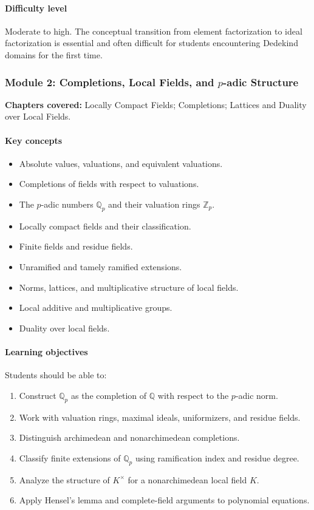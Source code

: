 \documentclass[11pt]{article}
\newcommand{\Q}{\mathbb{Q}}
\newcommand{\Z}{\mathbb{Z}}
\begin{document}
\paragraph{Difficulty level}
Moderate to high. The conceptual transition from element factorization to ideal factorization is essential and often difficult for students encountering Dedekind domains for the first time.

\subsubsection*{Module 2: Completions, Local Fields, and $p$-adic Structure}

\textbf{Chapters covered:} Locally Compact Fields; Completions; Lattices and Duality over Local Fields.

\paragraph{Key concepts}
\begin{itemize}
    \item Absolute values, valuations, and equivalent valuations.
    \item Completions of fields with respect to valuations.
    \item The $p$-adic numbers $\Q_p$ and their valuation rings $\Z_p$.
    \item Locally compact fields and their classification.
    \item Finite fields and residue fields.
    \item Unramified and tamely ramified extensions.
    \item Norms, lattices, and multiplicative structure of local fields.
    \item Local additive and multiplicative groups.
    \item Duality over local fields.
\end{itemize}

\paragraph{Learning objectives}
Students should be able to:
\begin{enumerate}
    \item Construct $\Q_p$ as the completion of $\Q$ with respect to the $p$-adic norm.
    \item Work with valuation rings, maximal ideals, uniformizers, and residue fields.
    \item Distinguish archimedean and nonarchimedean completions.
    \item Classify finite extensions of $\Q_p$ using ramification index and residue degree.
    \item Analyze the structure of $K^\times$ for a nonarchimedean local field $K$.
    \item Apply Hensel's lemma and complete-field arguments to polynomial equations.
\end{enumerate}
\end{document}

